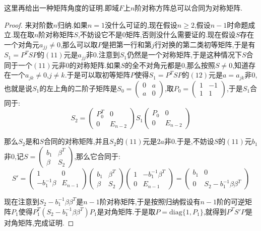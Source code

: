 这里再给出一种矩阵角度的证明.即域$F$上$n$阶对称方阵总可以合同为对称矩阵.
\begin{proof}
	
	来对阶数$n$归纳.如果$n=1$没什么可证的,现在假设$n\ge2$,假设$n-1$时命题成立.现在取$n$阶对称矩阵$S$,不妨设它不是0矩阵,否则没什么需要证的.现在假设$S$存在一个对角元$a_{jj}\not=0$,那么可以取$P$是把第一行和第$j$行对换的第二类初等矩阵,于是有$S_1=P^TSP$的$(11)$元是$a_{jj}$非0.注意到$S_1$仍然是一个对称矩阵,于是这种情况下$S$合同于一个$(11)$元非0的对称矩阵.如果$S$的全不对角元都是0,那么按照$S\not=0$,知道存在一个$a_{jk}\not=0$,$j\not=k$.于是可以取初等矩阵$P$使得$S_1=P^TSP$的$(12)$元是$a=a_{jk}$非0,也就是说$S_1$的左上角的二阶子矩阵是$S_0=\left(\begin{array}{cc}
	0&a\\
	a&0\end{array}\right)$,取$P_0=\left(\begin{array}{cc}
	1&-1\\
	1&1\end{array}\right)$,于是$S_1$合同于:
	$$S_2=\left(\begin{array}{cc}
	P_0^T&0\\
	0&E_{n-2}\end{array}\right)S_1\left(\begin{array}{cc}
	P_0&0\\
	0&E_{n-2}\end{array}\right)$$
	
	那么$S_2$是和$S$合同的对称矩阵,并且$S_2$的$(11)$元是$2a$非0.于是,不妨设$S$的$(11)$元$b_1$非0,记$S=\left(\begin{array}{cc}
	b_1&\beta^T\\
	\beta&S_2\end{array}\right)$,那么它合同于:
	$$S'=\left(\begin{array}{cc}
	1&0\\
	-b_1^{-1}\beta&E_{n-1}\end{array}\right)\left(\begin{array}{cc}
	b_1&\beta^T\\
	\beta&S_2\end{array}\right)\left(\begin{array}{cc}
	1&-b_1^{-1}\beta^T\\
	0&E_{n-1}\end{array}\right)=\left(\begin{array}{cc}
	b_1&0\\
	0&S_2-b_1^{-1}\beta\beta^T\end{array}\right)$$
	
	现在注意到$S_2-b_1^{-1}\beta\beta^T$是$n-1$阶对称矩阵,于是按照归纳假设有$n-1$阶的可逆矩阵$P_1$使得$P_1^T(S_2-b_1^{-1}\beta\beta^T)P_1$是对角矩阵.于是取$P=\mathrm{diag}\{1,P_1\}$,就得到$P^TS'P$是对角矩阵,完成证明.
	
\end{proof}

